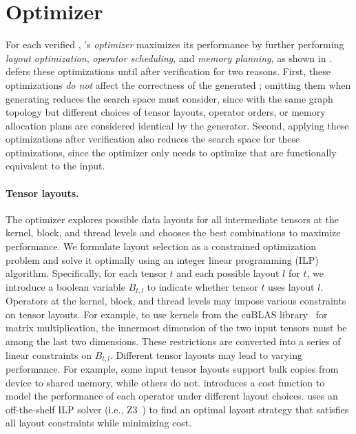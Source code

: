 \section{\graph Optimizer}
\label{sec:optimizer}

For each verified \graph, \sys's {\em \graph optimizer} maximizes its performance by further performing {\em layout optimization}, {\em operator scheduling}, and {\em memory planning}, as shown in . 
%
\sys defers these \graph optimizations until after verification for two reasons.
%
First, these optimizations {\em do not} affect the correctness of the generated \graphs; omitting them when generating \graphs reduces the search space \sys must consider, since \graphs with the same graph topology but different choices of tensor layouts, operator orders, or memory allocation plans are considered identical by the \graph generator.
Second, applying these optimizations after verification also reduces the search space for these optimizations, since the \graph optimizer only needs to optimize \graphs that are functionally equivalent to the input.


\paragraph{Tensor layouts.} The \graph optimizer explores possible data layouts for all intermediate tensors at the kernel, block, and thread levels and chooses the best combinations to maximize performance. We formulate layout selection as a constrained optimization problem and solve it optimally using an integer linear programming (ILP) algorithm.
%
Specifically, for each tensor $t$ and each possible layout $l$ for $t$, we introduce a boolean variable $B_{t,l}$ to indicate whether tensor $t$ uses layout $l$. 
Operators at the kernel, block, and thread levels may impose various constraints on tensor layouts.
For example, to use kernels from the cuBLAS library~\cite{cublas} for matrix multiplication, the innermost dimension of the two input tensors must be among the last two dimensions. These restrictions are converted into a series of linear constraints on $B_{t, l}$. Different tensor layouts may lead to varying performance. For example, some input tensor layouts support bulk copies from device to shared memory, while others do not. \sys introduces a cost function to model the performance of each operator under different layout choices.
%
\sys uses an off-the-shelf ILP solver (i.e., Z3~\cite{z3}) to find an optimal layout strategy that satisfies all layout constraints while minimizing cost.
%

